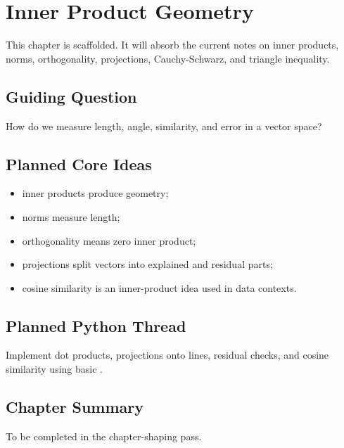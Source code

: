 \chapter{Inner Product Geometry}
\label{ch:inner-product-geometry}

\begin{draftbox}
This chapter is scaffolded. It will absorb the current notes on inner
products, norms, orthogonality, projections, Cauchy-Schwarz, and triangle
inequality.
\end{draftbox}

\section{Guiding Question}

How do we measure length, angle, similarity, and error in a vector space?

\section{Planned Core Ideas}

\begin{itemize}
  \item inner products produce geometry;
  \item norms measure length;
  \item orthogonality means zero inner product;
  \item projections split vectors into explained and residual parts;
  \item cosine similarity is an inner-product idea used in data contexts.
\end{itemize}

\section{Planned Python Thread}

Implement dot products, projections onto lines, residual checks, and cosine
similarity using basic \NumPy.

\section*{Chapter Summary}

To be completed in the chapter-shaping pass.


